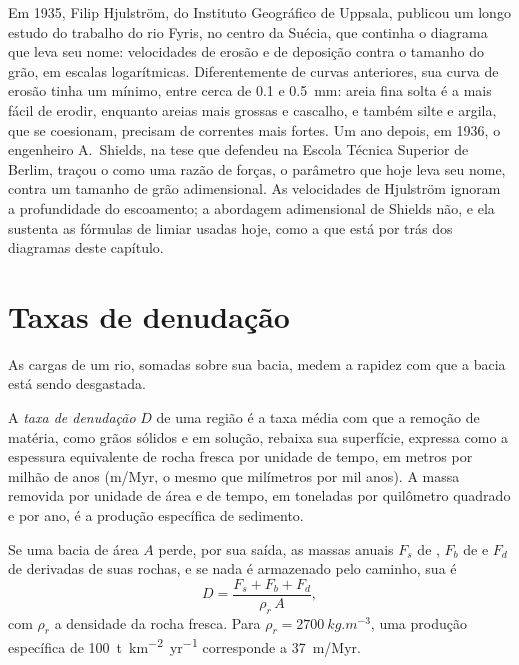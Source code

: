 \begin{history}
Em 1935, Filip Hjulström, do Instituto Geográfico de Uppsala, publicou um longo estudo do trabalho do rio Fyris, no centro da Suécia, que continha o diagrama que leva seu nome: velocidades de erosão e de deposição contra o tamanho do grão, em escalas logarítmicas. Diferentemente de curvas anteriores, sua curva de erosão tinha um mínimo, entre cerca de \num{0.1} e \qty{0.5}{mm}: areia fina solta é a mais fácil de erodir, enquanto areias mais grossas e cascalho, e também silte e argila, que se coesionam, precisam de correntes mais fortes. Um ano depois, em 1936, o engenheiro A.~Shields,
na tese que defendeu na Escola Técnica Superior de Berlim, traçou o  como uma razão de forças, o parâmetro que hoje leva seu nome, contra um tamanho de grão adimensional. As velocidades de Hjulström ignoram a profundidade do escoamento; a abordagem adimensional de Shields não, e ela sustenta as fórmulas de limiar usadas hoje, como a que está por trás dos diagramas deste capítulo.
\end{history}

\section{Taxas de denudação}\label{sec:b1:erosion-transport:denudation}

As cargas de um rio, somadas sobre sua bacia, medem a rapidez com que a bacia está sendo desgastada.

\begin{definition}\label{def:b1:erosion-transport:denudation}
A \emph{taxa de denudação} $D$ de uma região é a taxa média com que a remoção de matéria, como grãos sólidos e em solução, rebaixa sua superfície, expressa como a espessura equivalente de rocha fresca por unidade de tempo, em metros por milhão de anos (\unit{m/Myr}, o mesmo que milímetros por mil anos). A massa removida por unidade de área e de tempo, em toneladas por quilômetro quadrado e por ano, é a produção específica de sedimento.
\end{definition}

\begin{proposition}\label{prop:b1:erosion-transport:denudation}
Se uma bacia de área $A$ perde, por sua saída, as massas anuais $F_s$ de , $F_b$ de  e $F_d$ de  derivadas de suas rochas, e se nada é armazenado pelo caminho, sua  é
\[
  D = \frac{F_s + F_b + F_d}{\rho_r\,A},
\]
com $\rho_r$ a densidade da rocha fresca. Para $\rho_r =
\qty{2700}{kg.m^{-3}}$, uma produção específica de \qty{100}{t.km^{-2}.yr^{-1}} corresponde a \qty{37}{m/Myr}.
\end{proposition}


